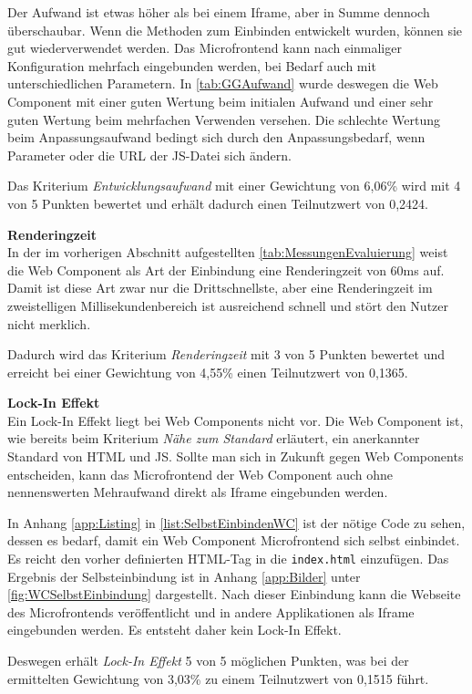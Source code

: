 Der Aufwand ist etwas höher als bei einem Iframe, aber in Summe dennoch überschaubar. Wenn die Methoden zum Einbinden entwickelt wurden, können sie gut wiederverwendet werden. Das Microfrontend kann nach einmaliger Konfiguration mehrfach eingebunden werden, bei Bedarf auch mit unterschiedlichen Parametern. In \cref{tab:GGAufwand} wurde deswegen die Web Component mit einer guten Wertung beim initialen Aufwand und einer sehr guten Wertung beim mehrfachen Verwenden versehen. Die schlechte Wertung beim Anpassungsaufwand bedingt sich durch den Anpassungsbedarf, wenn Parameter oder die URL der \gls{JS}-Datei sich ändern.

Das Kriterium \textit{Entwicklungsaufwand} mit einer Gewichtung von 6,06\% wird mit 4 von 5 Punkten bewertet und erhält dadurch einen Teilnutzwert von 0,2424.

\textbf{Renderingzeit}\\
In der im vorherigen Abschnitt aufgestellten \cref{tab:MessungenEvaluierung} weist die Web Component als Art der Einbindung eine Renderingzeit von 60ms auf. Damit ist diese Art zwar nur die Drittschnellste, aber eine Renderingzeit im zweistelligen Millisekundenbereich ist ausreichend schnell und stört den Nutzer nicht merklich.

Dadurch wird das Kriterium \textit{Renderingzeit} mit 3 von 5 Punkten bewertet und erreicht bei einer Gewichtung von 4,55\% einen Teilnutzwert von 0,1365.

\textbf{Lock-In Effekt}\\
Ein Lock-In Effekt liegt bei Web Components nicht vor. Die Web Component ist, wie bereits beim Kriterium \textit{Nähe zum Standard} erläutert, ein anerkannter Standard von \gls{HTML} und \gls{JS}. Sollte man sich in Zukunft gegen Web Components entscheiden, kann das Microfrontend der Web Component auch ohne nennenswerten Mehraufwand direkt als Iframe eingebunden werden.

In Anhang \ref{app:Listing} in \cref{list:SelbstEinbindenWC} ist der nötige Code zu sehen, dessen es bedarf, damit ein Web Component Microfrontend sich selbst einbindet. Es reicht den vorher definierten \gls{HTML}-Tag in die \texttt{index.html} einzufügen. Das Ergebnis der Selbsteinbindung ist in Anhang \ref{app:Bilder} unter \cref{fig:WCSelbstEinbindung} dargestellt.  Nach dieser Einbindung kann die Webseite des Microfrontends veröffentlicht und in andere Applikationen als Iframe eingebunden werden. Es entsteht daher kein Lock-In Effekt.

Deswegen erhält \textit{Lock-In Effekt} 5 von 5 möglichen Punkten, was bei der ermittelten Gewichtung von 3,03\% zu einem Teilnutzwert von 0,1515 führt.

